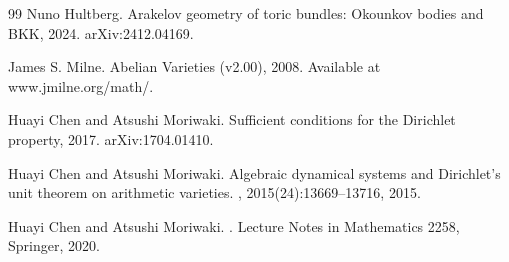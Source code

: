 \documentclass[10pt,a4paper]{amsart}
\theoremstyle{plain}
\theoremstyle{plain}
\numberwithin{equation}{section}
\begin{document}
\begin{thebibliography}{99}
		Nuno Hultberg.
		\newblock Arakelov geometry of toric bundles: Okounkov bodies and BKK, 2024.
		\newblock arXiv:2412.04169.
		
		James S. Milne.
		\newblock Abelian Varieties (v2.00), 2008.
		\newblock Available at www.jmilne.org/math/.
		
		Huayi Chen and Atsushi Moriwaki.
		\newblock Sufficient conditions for the Dirichlet property, 2017.
		\newblock arXiv:1704.01410.
		
		Huayi Chen and Atsushi Moriwaki.
		\newblock Algebraic dynamical systems and Dirichlet's unit theorem on arithmetic varieties.
		, 2015(24):13669--13716, 2015.
		
		Huayi Chen and Atsushi Moriwaki.
		.
		\newblock Lecture Notes in Mathematics 2258, Springer, 2020.
		
	\end{thebibliography}
\end{document}
